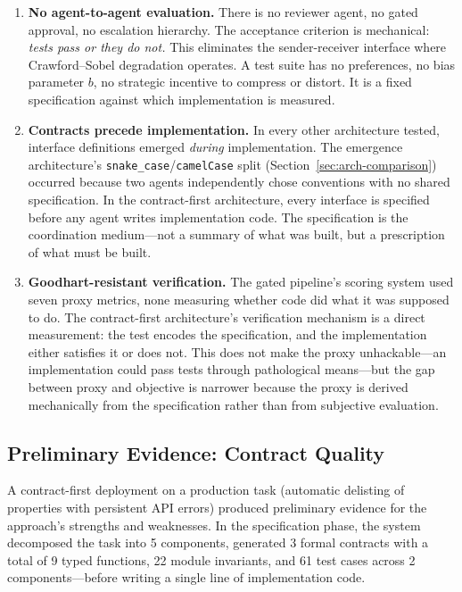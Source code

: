 \documentclass[11pt,a4paper]{article}
\begin{document}
\begin{enumerate}
\item \textbf{No agent-to-agent evaluation.} There is no reviewer agent, no gated approval, no escalation hierarchy. The acceptance criterion is mechanical: \emph{tests pass or they do not.} This eliminates the sender-receiver interface where Crawford--Sobel degradation operates. A test suite has no preferences, no bias parameter $b$, no strategic incentive to compress or distort. It is a fixed specification against which implementation is measured.

\item \textbf{Contracts precede implementation.} In every other architecture tested, interface definitions emerged \emph{during} implementation. The emergence architecture's \texttt{snake\_case}/\texttt{camelCase} split (Section~\ref{sec:arch-comparison}) occurred because two agents independently chose conventions with no shared specification. In the contract-first architecture, every interface is specified before any agent writes implementation code. The specification is the coordination medium---not a summary of what was built, but a prescription of what must be built.

\item \textbf{Goodhart-resistant verification.} The gated pipeline's scoring system used seven proxy metrics, none measuring whether code did what it was supposed to do. The contract-first architecture's verification mechanism is a direct measurement: the test encodes the specification, and the implementation either satisfies it or does not. This does not make the proxy unhackable---an implementation could pass tests through pathological means---but the gap between proxy and objective is narrower because the proxy is derived mechanically from the specification rather than from subjective evaluation.
\end{enumerate}

\subsection{Preliminary Evidence: Contract Quality}

A contract-first deployment on a production task (automatic delisting of properties with persistent API errors) produced preliminary evidence for the approach's strengths and weaknesses. In the specification phase, the system decomposed the task into 5 components, generated 3 formal contracts with a total of 9 typed functions, 22 module invariants, and 61 test cases across 2 components---before writing a single line of implementation code.
\end{document}
